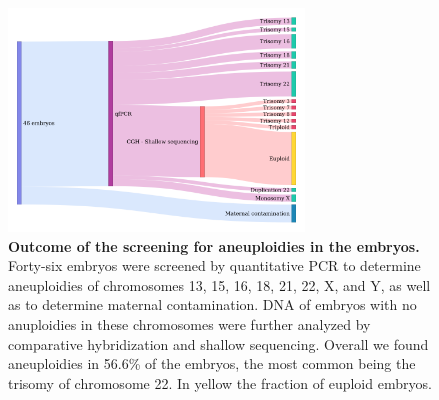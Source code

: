 \begin{figure}[h]
\centering
\includegraphics[width=0.7\textwidth]{fig/ibelieve.png}
\caption{\textbf{Outcome of the screening for aneuploidies in the embryos.} Forty-six embryos were screened by quantitative PCR to determine aneuploidies of chromosomes 13, 15, 16, 18, 21, 22, X, and Y, as well as to determine maternal contamination. DNA of embryos with no anuploidies in these chromosomes were further analyzed by comparative hybridization and shallow sequencing. Overall we found aneuploidies in  56.6\% of the embryos, the most common being the trisomy of chromosome 22. In yellow the fraction of euploid embryos. }
\label{fig:presequencing}
\end{figure}

